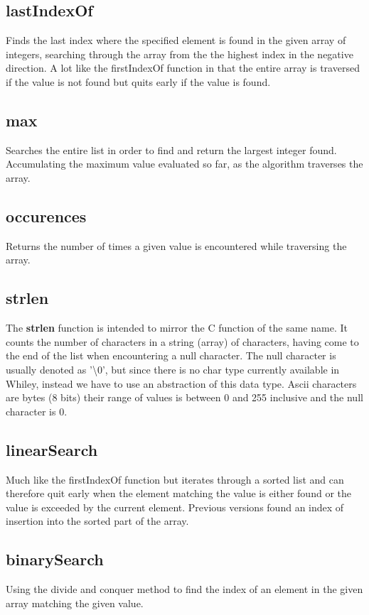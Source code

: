 \documentclass[10pt]{article} %
\begin{document}
\subsection{lastIndexOf}
Finds the last index where the specified element is found in the given array of integers, searching through the array from the the highest index in the negative direction. A lot like the firstIndexOf function in that the entire array is traversed if the value is not found but quits early if the value is found.

\subsection{max}
Searches the entire list in order to find and return the largest integer found. Accumulating the maximum value evaluated so far, as the algorithm traverses the array. 

\subsection{occurences}
Returns the number of times a given value is encountered while traversing the array.

\subsection{strlen}
The \textbf{strlen} function is intended to mirror the C function of the same name. It counts the number of characters in a string (array) of characters, having come to the end of the list when encountering a null character. The null character is usually denoted as '\textbackslash0', but since there is no char type currently available in Whiley, instead we have to use an abstraction of this data type. Ascii characters are bytes (8 bits) their range of values is between 0 and 255 inclusive and the null character is 0.

\subsection{linearSearch}
Much like the firstIndexOf function but iterates through a sorted list and can therefore quit early when the element matching the value is either found or the value is exceeded by the current element. Previous versions found an index of insertion into the sorted part of the array.

\subsection{binarySearch}
Using the divide and conquer method to find the index of an element in the given array matching the given value.
\end{document}
